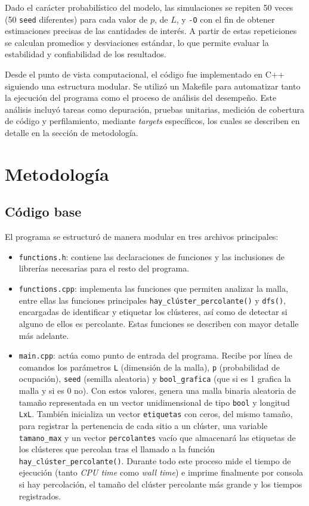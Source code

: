 \documentclass[%
 reprint,
 amsmath,amssymb,
 aps,
]{revtex4-2}
\begin{document}
Dado el carácter probabilístico del modelo, las simulaciones se repiten 50 veces (50 \texttt{seed} diferentes) para cada valor de $p$, de $L$, y \texttt{-O} con el fin de obtener estimaciones precisas de las cantidades de interés. A partir de estas repeticiones se calculan promedios y desviaciones estándar, lo que permite evaluar la estabilidad y confiabilidad de los resultados.

Desde el punto de vista computacional, el código fue implementado en C++ siguiendo una estructura modular. Se utilizó un Makefile para automatizar tanto la ejecución del programa como el proceso de análisis del desempeño. Este análisis incluyó tareas como depuración, pruebas unitarias, medición de cobertura de código y perfilamiento, mediante \textit{targets} específicos, los cuales se describen en detalle en la sección de metodología.

\section{Metodología}

\subsection{Código base}

El programa se estructuró de manera modular en tres archivos principales:

\begin{itemize}
    \item \texttt{functions.h}: contiene las declaraciones de funciones y las inclusiones de librerías necesarias para el resto del programa.
    
    \item \texttt{functions.cpp}: implementa las funciones que permiten analizar la malla, entre ellas las funciones principales \texttt{hay\_clúster\_percolante()} y \texttt{dfs()}, encargadas de identificar y etiquetar los clústeres, así como de detectar si alguno de ellos es percolante. Estas funciones se describen con mayor detalle más adelante.
    
    \item \texttt{main.cpp}: actúa como punto de entrada del programa. Recibe por línea de comandos los parámetros \texttt{L} (dimensión de la malla), \texttt{p} (probabilidad de ocupación), \texttt{seed} (semilla aleatoria) y \texttt{bool\_grafica} (que si es 1 grafica la malla y si es 0 no). Con estos valores, genera una malla binaria aleatoria de tamaño representada en un vector unidimensional de tipo \texttt{bool} y longitud \texttt{LxL}. También inicializa un vector \texttt{etiquetas} con ceros, del mismo tamaño, para registrar la pertenencia de cada sitio a un clúster, una variable \texttt{tamano\_max} y un vector \texttt{percolantes} vacío que almacenará las etiquetas de los clústeres que percolan tras el llamado a la función \texttt{hay\_clúster\_percolante()}. Durante todo este proceso mide el tiempo de ejecución (tanto \textit{CPU time} como \textit{wall time}) e imprime finalmente por consola si hay percolación, el tamaño del clúster percolante más grande y los tiempos registrados.
    
\end{itemize}
\end{document}

